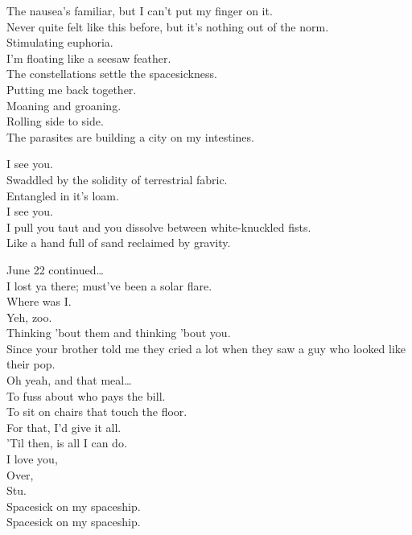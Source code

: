The nausea's familiar, but I can't put my finger on it. \\
Never quite felt like this before, but it's nothing out of the norm. \\
Stimulating euphoria. \\
I'm floating like a seesaw feather. \\
The constellations settle the spacesickness. \\
Putting me back together. \\

Moaning and groaning. \\
Rolling side to side. \\
The parasites are building a city on my intestines. \\


I see you. \\
Swaddled by the solidity of terrestrial fabric. \\
Entangled in it's loam. \\
I see you. \\
I pull you taut and you dissolve between white-knuckled fists. \\
Like a hand full of sand reclaimed by gravity. \\


June 22 continued… \\
I lost ya there; must've been a solar flare. \\
Where was I. \\
Yeh, zoo. \\
Thinking 'bout them and thinking 'bout you. \\
Since your brother told me they cried a lot when they saw a guy who looked like their pop. \\
Oh yeah, and that meal… \\
To fuss about who pays the bill. \\
To sit on chairs that touch the floor. \\
For that, I'd give it all. \\
'Til then,  is all I can do. \\
I love you, \\
Over, \\
Stu. \\

Spacesick on my spaceship. \\
Spacesick on my spaceship. \\

